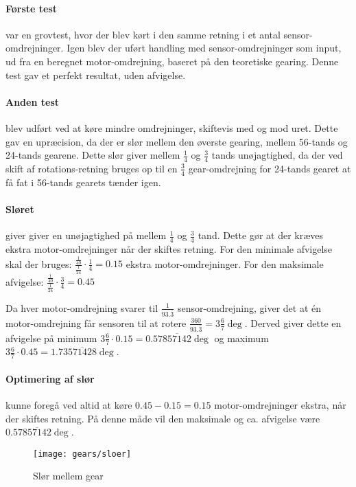 \paragraph{Første test} var en grovtest, hvor der blev kørt i den samme retning i et antal sensor-omdrejninger.
Igen blev der uført handling med sensor-omdrejninger som input, ud fra en beregnet motor-omdrejning, baseret på den teoretiske gearing.
Denne test gav et perfekt resultat, uden afvigelse.

\paragraph{Anden test} blev udført ved at køre mindre omdrejninger, skiftevis med og mod uret.
Dette gav en upræcision, da der er slør mellem den øverste gearing, mellem 56-tands og 24-tands gearene.
Dette slør giver mellem $\frac{1}{4}$ og $\frac{3}{4}$ tands unøjagtighed, da der ved skift af rotations-retning bruges op til en $\frac{3}{4}$ gear-omdrejning for 24-tands gearet at få fat i 56-tands gearets tænder igen.

\paragraph{Sløret} giver giver en unøjagtighed på mellem $\frac{1}{4}$ og $\frac{3}{4}$ tand.
Dette gør at der kræves ekstra motor-omdrejninger når der skiftes retning.
For den minimale afvigelse skal der bruges: $ \frac{\frac{1}{40}}{\frac{1}{24}}\cdot\frac{1}{4} = 0.15$ ekstra motor-omdrejninger.
For den maksimale afvigelse: $ \frac{\frac{1}{40}}{\frac{1}{24}}\cdot\frac{3}{4} = 0.45$

Da hver motor-omdrejning svarer til $\frac{1}{93.\overline{3}}$ sensor-omdrejning, giver det at én motor-omdrejning får sensoren til at rotere $\frac{360}{93.\overline{3}} = 3\frac{6}{7}\deg$.
Derved giver dette en afvigelse på minimum $3\frac{6}{7}\cdot0.15 = 0.57\overline{857142}\deg$ og maximum $3\frac{6}{7}\cdot0.45 = 1.73\overline{571428}\deg$.

\paragraph{Optimering af slør} kunne foregå ved altid at køre $0.45 - 0.15 = 0.15$ motor-omdrejninger ekstra, når der skiftes retning.
På denne måde vil den maksimale og ca. afvigelse være $0.57\overline{857142}\deg$.

\begin{figure}[h]
\centering
\texttt{[image: gears/sloer]}
\caption{Slør mellem gear}
\label{gearing:sloer}
\end{figure}